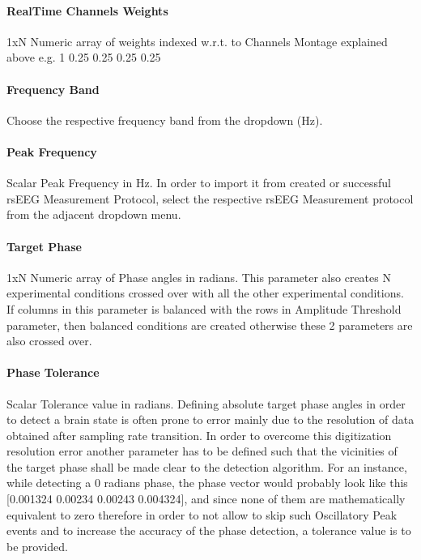 \documentclass[letterpaper,10pt,english]{sphinxmanual}
\begin{document}
\paragraph{Real\sphinxhyphen{}Time Channels Weights}
\label{\detokenize{14_ERPMeasurement:real-time-channels-weights}}
\sphinxAtStartPar
1xN Numeric array of weights indexed w.r.t. to Channels Montage explained above e.g. 1 \sphinxhyphen{}0.25 \sphinxhyphen{}0.25 \sphinxhyphen{}0.25 \sphinxhyphen{}0.25


\paragraph{Frequency Band}
\label{\detokenize{14_ERPMeasurement:frequency-band}}
\sphinxAtStartPar
Choose the respective frequency band from the dropdown (Hz).


\paragraph{Peak Frequency}
\label{\detokenize{14_ERPMeasurement:peak-frequency}}
\sphinxAtStartPar
Scalar Peak Frequency in Hz. In order to import it from created or successful rsEEG Measurement Protocol, select the respective rsEEG Measurement protocol from the adjacent dropdown menu.


\paragraph{Target Phase}
\label{\detokenize{14_ERPMeasurement:target-phase}}
\sphinxAtStartPar
1xN Numeric array of Phase angles in radians. This parameter also creates N experimental conditions crossed over with all the other experimental conditions. If columns in this parameter is balanced with the rows in Amplitude Threshold parameter, then balanced conditions are created otherwise these 2 parameters are also crossed over.


\paragraph{Phase Tolerance}
\label{\detokenize{14_ERPMeasurement:phase-tolerance}}
\sphinxAtStartPar
Scalar Tolerance value in radians. Defining absolute target phase angles in order to detect a brain state is often prone to error mainly due to the resolution of data obtained after sampling rate transition. In order to overcome this digitization resolution error another parameter has to be defined such that the vicinities of the target phase shall be made clear to the detection algorithm. For an instance, while detecting a 0 radians phase, the phase vector would probably look like this {[}\sphinxhyphen{}0.001324 \sphinxhyphen{}0.00234 0.00243 0.004324{]}, and since none of them are mathematically equivalent to zero therefore in order to not allow to skip such Oscillatory Peak events and to increase the accuracy of the phase detection, a tolerance value is to be provided.
\end{document}
